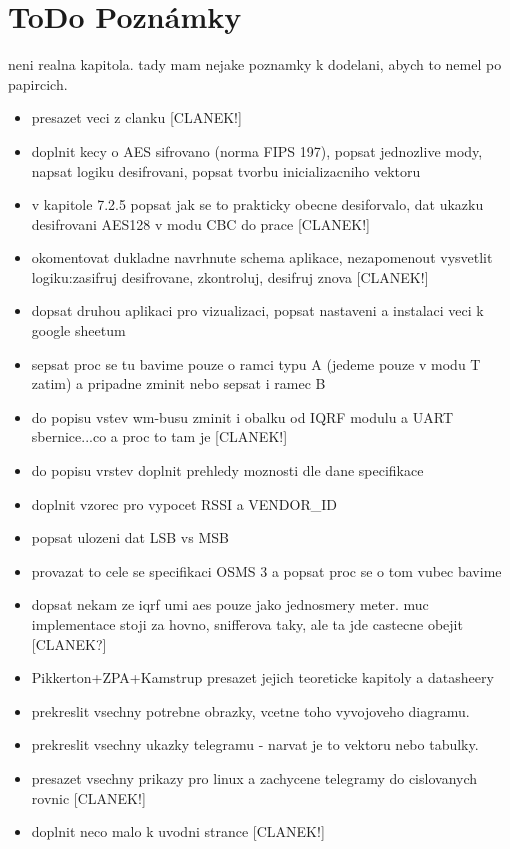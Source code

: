 \chapter{ToDo Poznámky}

\colorbox[rgb]{0,1,0}{neni realna kapitola. tady mam nejake poznamky k dodelani, abych to nemel po papircich.}

\begin{itemize}
	\item presazet veci z clanku [CLANEK!]
	\item doplnit kecy o AES sifrovano (norma FIPS 197), popsat jednozlive mody, napsat logiku desifrovani, popsat tvorbu inicializacniho vektoru
	\item v kapitole 7.2.5 popsat jak se to prakticky obecne desiforvalo, dat ukazku desifrovani AES128 v modu CBC do prace [CLANEK!]
	\item okomentovat dukladne navrhnute schema aplikace, nezapomenout vysvetlit logiku:zasifruj desifrovane, zkontroluj, desifruj znova [CLANEK!]
	\item dopsat druhou aplikaci pro vizualizaci, popsat nastaveni a instalaci veci k google sheetum
	\item sepsat proc se tu bavime pouze o ramci typu A (jedeme pouze v modu T zatim) a pripadne zminit nebo sepsat i ramec B
	\item do popisu vstev wm-busu zminit i obalku od IQRF modulu a UART sbernice...co a proc to tam je [CLANEK!]
	\item do popisu vrstev doplnit prehledy moznosti dle dane specifikace
	\item doplnit vzorec pro vypocet RSSI a VENDOR\_ID
	\item popsat ulozeni dat LSB vs MSB
	\item provazat to cele se specifikaci OSMS 3 a popsat proc se o tom vubec bavime
	\item dopsat nekam ze iqrf umi aes pouze jako jednosmery meter. muc implementace stoji za hovno, snifferova taky, ale ta jde castecne obejit [CLANEK?]
	\item Pikkerton+ZPA+Kamstrup presazet jejich teoreticke kapitoly a datasheery
	\item prekreslit vsechny potrebne obrazky, vcetne toho vyvojoveho diagramu. 
	\item prekreslit vsechny ukazky telegramu - narvat je to vektoru nebo tabulky.
	\item presazet vsechny prikazy pro linux a zachycene telegramy do cislovanych rovnic [CLANEK!]
	\item doplnit neco malo k uvodni strance [CLANEK!]

\end{itemize}
